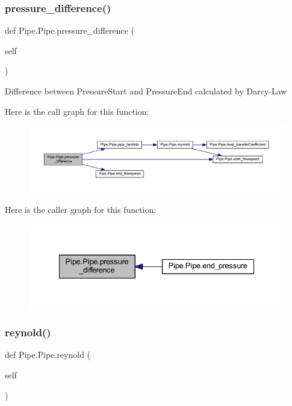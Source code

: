 \subsubsection{\texorpdfstring{pressure\+\_\+difference()}{pressure\_difference()}}
{\footnotesize\ttfamily def Pipe.\+Pipe.\+pressure\+\_\+difference (\begin{DoxyParamCaption}\item[{}]{self }\end{DoxyParamCaption})}

\begin{DoxyVerb}Difference between PressureStart and PressureEnd
calculated by Darcy-Law
\end{DoxyVerb}
 Here is the call graph for this function\+:
\nopagebreak
\begin{figure}[H]
\begin{center}
\leavevmode
\includegraphics[width=350pt]{class_pipe_1_1_pipe_a69d6c5c5204633f84cc45801adf17aed_cgraph}
\end{center}
\end{figure}
Here is the caller graph for this function\+:
\nopagebreak
\begin{figure}[H]
\begin{center}
\leavevmode
\includegraphics[width=335pt]{class_pipe_1_1_pipe_a69d6c5c5204633f84cc45801adf17aed_icgraph}
\end{center}
\end{figure}
\mbox{\label{class_pipe_1_1_pipe_afec35167b5ad4acf26ea2db36292d135}} 
\subsubsection{\texorpdfstring{reynold()}{reynold()}}
{\footnotesize\ttfamily def Pipe.\+Pipe.\+reynold (\begin{DoxyParamCaption}\item[{}]{self }\end{DoxyParamCaption})}

